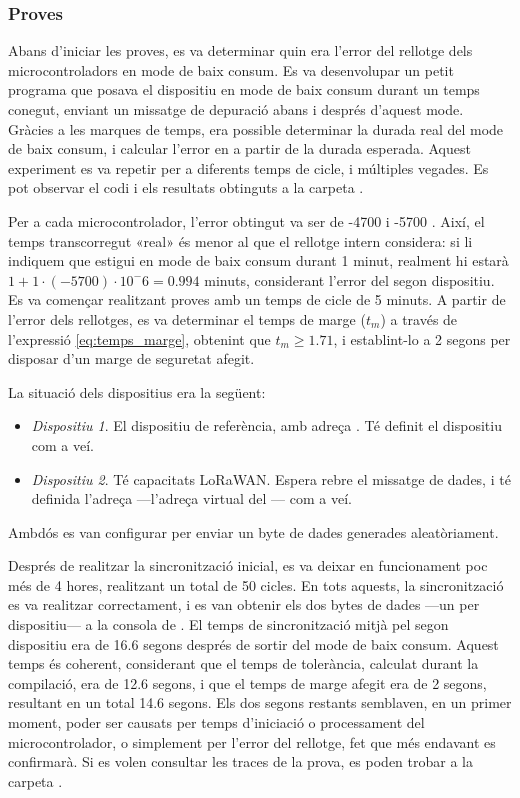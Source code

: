 \documentclass{tfgitic}[2024/07/01]
\begin{document}
{\subsubsection{Proves}
Abans d'iniciar les proves, es va determinar quin era l'error del rellotge dels microcontroladors en mode de baix consum. Es va desenvolupar un petit programa que posava el dispositiu en mode de baix consum durant un temps conegut, enviant un missatge de depuració abans i després d'aquest mode. Gràcies a les marques de temps, era possible determinar la durada real del mode de baix consum, i calcular l'error en  a partir de la durada esperada. Aquest experiment es va repetir per a diferents temps de cicle, i múltiples vegades. Es pot observar el codi i els resultats obtinguts a la carpeta .

Per a cada microcontrolador, l'error obtingut va ser de -4700  i -5700 . Així, el temps transcorregut «real» és menor al que el rellotge intern considera: si li indiquem que estigui en mode de baix consum durant 1 minut, realment hi estarà $1+1\cdot (-5700)\cdot10^-6=0.994$ minuts, considerant l'error del segon dispositiu. 
\newline
\newline
Es va començar realitzant proves amb un temps de cicle de 5 minuts. A partir de l'error dels rellotges, es va determinar el temps de marge ($t_m$) a través de l'expressió \ref{eq:temps_marge}, obtenint que $t_m \ge 1.71$, i establint-lo a 2 segons per disposar d'un marge de seguretat afegit. 

La situació dels dispositius era la següent:
\begin{itemize}
    \item \emph{Dispositiu 1}. El dispositiu de referència, amb adreça . Té definit el dispositiu  com a veí.
    \item \emph{Dispositiu 2}. Té capacitats LoRaWAN. Espera rebre el missatge de dades, i té definida l'adreça  ---l'adreça virtual del --- com a veí.
\end{itemize}

Ambdós es van configurar per enviar un byte de dades generades aleatòriament.


Després de realitzar la sincronització inicial, es va deixar en funcionament poc més de 4 hores, realitzant un total de 50 cicles. En tots aquests, la sincronització es va realitzar correctament, i es van obtenir els dos bytes de dades ---un per dispositiu--- a la consola de . El temps de sincronització mitjà pel segon dispositiu era de 16.6 segons després de sortir del mode de baix consum. Aquest temps és coherent, considerant que el temps de tolerància, calculat durant la compilació, era de 12.6 segons, i que el temps de marge afegit era de 2 segons, resultant en un total 14.6 segons. Els dos segons restants semblaven, en un primer moment, poder ser causats per temps d'iniciació o processament del microcontrolador, o simplement per l'error del rellotge, fet que més endavant es confirmarà. Si es volen consultar les traces de la prova, es poden trobar a la carpeta .

}
\end{document}
